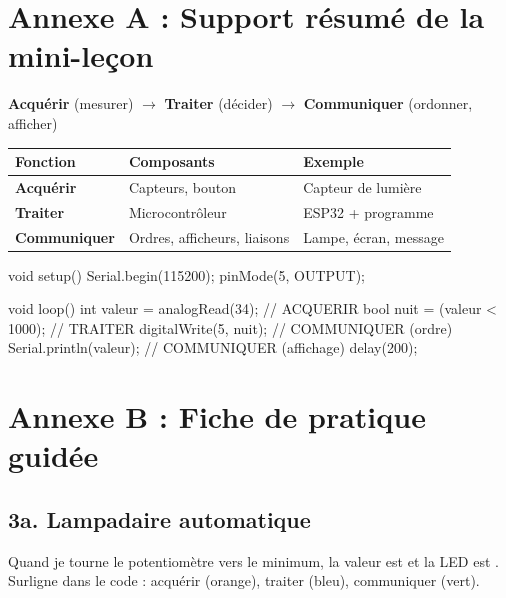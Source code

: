 \documentclass[11pt,a4paper]{article}
\begin{document}

\newpage
\section*{Annexe A : Support résumé de la mini-leçon}

\begin{tcolorbox}[colback=yellow!10,colframe=yellow!50!black]
\textbf{Acquérir} (mesurer) $\rightarrow$ \textbf{Traiter} (décider) $\rightarrow$ \textbf{Communiquer} (ordonner, afficher)
\end{tcolorbox}

\begin{tabularx}{\linewidth}{>{\bfseries}p{2.8cm}Y Y}
\toprule
Fonction & Composants & Exemple\\
\midrule
Acquérir & Capteurs, bouton & Capteur de lumière\\
Traiter & Microcontrôleur & ESP32 + programme\\
Communiquer & Ordres, afficheurs, liaisons & Lampe, écran, message\\
\bottomrule
\end{tabularx}

\begin{arduino}
void setup() {
  Serial.begin(115200);
  pinMode(5, OUTPUT);
}

void loop() {
  int valeur = analogRead(34);     // ACQUERIR
  bool nuit = (valeur < 1000);     // TRAITER
  digitalWrite(5, nuit);           // COMMUNIQUER (ordre)
  Serial.println(valeur);          // COMMUNIQUER (affichage)
  delay(200);
}
\end{arduino}

\newpage
\section*{Annexe B : Fiche de pratique guidée}

\subsection*{3a. Lampadaire automatique}
Quand je tourne le potentiomètre vers le minimum, la valeur est \dotfill{} et la LED est \dotfill.\\
Surligne dans le code : acquérir (orange), traiter (bleu), communiquer (vert).
\end{document}

